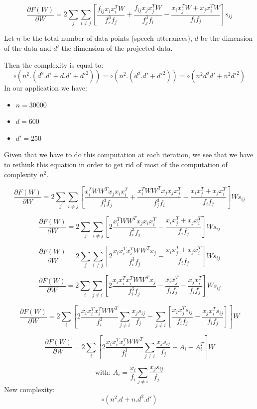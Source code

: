 \documentclass{techrep}
\begin{document}
$$\frac{\partial{F(W)}}{\partial{W}} =
2\sum_{j}\sum_{i\neq{}j}\left[\frac{f_{ij}x_ix_i^TW}{f_i^3f_j} +
  \frac{f_{ij}x_jx_j^TW}{f_j^3f_i} - \frac{x_ix_j^TW + x_jx_i^TW}{f_if_j}\right]s_{ij}$$

Let $n$ be the total number of data points (speech utterances), $d$ be
the dimension of the data and $d'$ the dimension of the projected
data.

Then the complexity is equal to:
$$\circ{(n^2.(d^2.d'+d.d'+d'^2))} = \circ{(n^2.(d^2.d'+d'^2))} = \circ{(n^2d^2d'+n^2d'^2)}$$
In our application we have:
\begin{itemize}
  \item $n = 30000$
  \item $d = 600$
  \item $d' = 250$
\end{itemize}

Given that we have to do this computation at each iteration, we see
that we have to rethink this equation in order to get rid of most of
the computation of complexity $n^2$.

$$\frac{\partial{F(W)}}{\partial{W}} =
2\sum_{j}\sum_{i\neq{}j}\left[\frac{x_i^TWW^Tx_jx_ix_i^T}{f_i^3f_j} +
  \frac{x_i^TWW^Tx_jx_jx_j^T}{f_j^3f_i} - \frac{x_ix_j^T + x_jx_i^T}{f_if_j}\right]Ws_{ij}$$

$$\frac{\partial{F(W)}}{\partial{W}} =
2\sum_{j}\sum_{i\neq{}j}\left[2\frac{x_i^TWW^Tx_jx_ix_i^T}{f_i^3f_j}
   - \frac{x_ix_j^T + x_jx_i^T}{f_if_j}\right]Ws_{ij}$$

$$\frac{\partial{F(W)}}{\partial{W}} =
2\sum_{j}\sum_{i\neq{}j}\left[2\frac{x_ix_i^Tx_i^TWW^Tx_j}{f_i^3f_j}
   - \frac{x_ix_j^T + x_jx_i^T}{f_if_j}\right]Ws_{ij}$$

$$\frac{\partial{F(W)}}{\partial{W}} =
2\sum_{i}\sum_{j\neq{}i}\left[2\frac{x_ix_i^Tx_i^TWW^Tx_j}{f_i^3f_j}
   - \frac{x_ix_j^T}{f_if_j} - \frac{x_jx_i^T}{f_if_j}\right]Ws_{ij}$$

$$\frac{\partial{F(W)}}{\partial{W}} =
2\sum_{i}\left[2\frac{x_ix_i^Tx_i^TWW^T}{f_i^3}\sum_{j\neq{}i}\frac{x_js_{ij}}{f_j}
  - \sum_{j\neq{}i}\left[\frac{x_ix_j^Ts_{ij}}{f_if_j} - \frac{x_jx_i^Ts_{ij}}{f_if_j}\right]\right]W$$

$$\frac{\partial{F(W)}}{\partial{W}} =
2\sum_{i}\left[2\frac{x_ix_i^Tx_i^TWW^T}{f_i^3}\sum_{j\neq{}i}\frac{x_js_{ij}}{f_j}
  - A_i - A_i^T\right]W$$

$$\text{with: } A_i = \frac{x_i}{f_i}\sum_{j\neq{}i}\frac{x_js_{ij}}{f_j}$$
New complexity: $$\circ{(n^2.d+n.d^2.d')}$$
\end{document}
